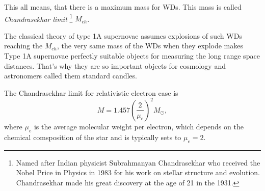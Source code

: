 \documentclass[oneside,a4paper,11pt]{report}
\begin{document}
This all means, that there is a maximum mass for WDs. This mass is called \textit{Chandrasekhar limit}
\footnote{Named after Indian physicist Subrahmanyan Chandrasekhar who received the Nobel Price in Physics in 1983 for his 
work on stellar structure and evolution. Chandrasekhar made his great discovery at the age of 21 in the 1931.   } $M_{ch}$.  

The classical theory of type 1A supernovae assumes explosions of such WDs reaching the $M_{ch}$, the very same 
mass of the WDs when they explode makes Type 1A supernovae perfectly suitable objects for measuring the long range 
space distances. That's why they are so important objects for cosmology and astronomers called 
them standard candles.

The Chandrasekhar limit for relativistic electron case is
\begin{equation}
 \label{chlim}
M=1.457\left ( \frac{2}{\mu_e} \right )^2 M_{\odot},
\end{equation}
where $\mu_e$ is the average molecular weight per electron, which depends on the chemical comsposition of the star and is typically sets 
to $\mu_e = 2$. 
\end{document}
